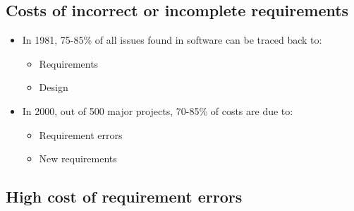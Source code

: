 \documentclass[12pt]{book}
\begin{document}
\subsection*{Costs of incorrect or incomplete requirements}

\begin{itemize}

  \item In 1981, 75-85\% of all issues found in software can be traced back to:
  \begin{itemize}
    \item Requirements
    \item Design
  \end{itemize}

  \item In 2000, out of 500 major projects, 70-85\% of costs are due to:
  \begin{itemize}
    \item Requirement errors
    \item New requirements
  \end{itemize}

\end{itemize}

\subsection*{High cost of requirement errors}
\end{document}
